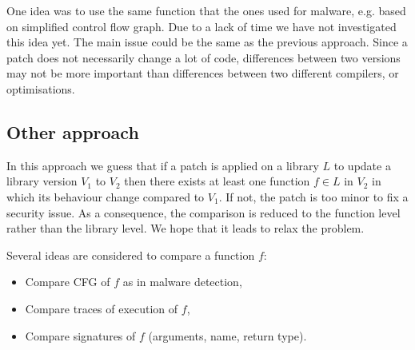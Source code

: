 \documentclass{article}
\begin{document}
	One idea was to use the same function that the ones used for malware, e.g. based on simplified control flow graph. Due to a lack of time we have not investigated this idea yet. The main issue could be the same as the previous approach. Since a patch does not necessarily change a lot of code, differences between two versions may not be more important than differences between two different compilers, or optimisations.
	
	\subsection{Other approach}
	

 

    
    
    
   
	In this approach we guess that if a patch is applied on a library $L$ to update a library version $V_1$ to $V_2$ then there exists at least one function $f \in L$ in $V_2$ in which its behaviour change compared to $V_1$. If not, the patch is too minor to fix a security issue. As a consequence, the comparison is reduced to the function level rather than the library level. We hope that it leads to relax the problem.
	
	
  Several ideas are considered to compare a function $f$:  
	\begin{itemize}
		\item Compare CFG of $f$ as in malware detection,
		\item Compare traces of execution of $f$,
		\item Compare signatures of $f$ (arguments, name, return type).
	\end{itemize}
	
\end{document}
